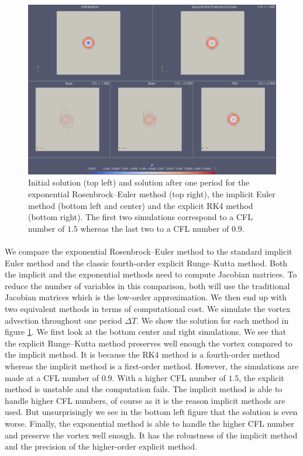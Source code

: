     \begin{figure}
      \centering
      \includegraphics[width=\textwidth]{figures/covo_cedre_fields.png}
      \caption{Initial solution (top left) and solution after one period for the exponential Rosenbrock--Euler method (top right), the implicit Euler method (bottom left and center) and the explicit RK4 method (bottom right).
      The first two simulations correspond to a CFL number of $1.5$ whereas the last two to a CFL number of $0.9$.}
      \label{fig:covo_cedre_fields}
    \end{figure}

    \paragraph{}
    We compare the exponential Rosenbrock--Euler method to the standard implicit Euler method and the classic fourth-order explicit Runge--Kutta method.
    Both the implicit and the exponential methods need to compute Jacobian matrices.
    To reduce the number of variables in this comparison, both will use the traditional Jacobian matrices which is the low-order approximation.
    We then end up with two equivalent methods in terms of computational cost.
    We simulate the vortex advection throughout one period $\Delta T$.
    We show the solution for each method in figure \ref{fig:covo_cedre_fields}.
    We first look at the bottom center and right simulations.
    We see that the explicit Runge--Kutta method preserves well enough the vortex compared to the implicit method.
    It is because the RK4 method is a fourth-order method whereas the implicit method is a first-order method.
    However, the simulations are made at a CFL number of $0.9$.
    With a higher CFL number of $1.5$, the explicit method is unstable and the computation fails.
    The implicit method is able to handle higher CFL numbers, of course as it is the reason implicit methods are used.
    But unsurprisingly we see in the bottom left figure that the solution is even worse.
    Finally, the exponential method is able to handle the higher CFL number and preserve the vortex well enough.
    It has the robustness of the implicit method and the precision of the higher-order explicit method.

